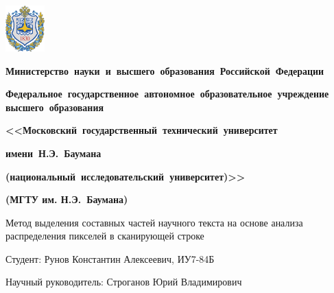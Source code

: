 \documentclass[gray]{beamer}
\begin{document}
\begingroup
{}
\begin{frame}
    \begin{minipage}{0.1\textwidth}
            \vspace{-0.1cm}
        \includegraphics[width=1.5cm]{img/bmstu.pdf}
    \end{minipage}
    \hfill
    \begin{minipage}{0.8\textwidth}\centering\bfseries
        {
            \linespread{1}\selectfont\tiny
            \vspace{0.1cm}
            \textbf{Министерство~науки~и~высшего~образования~Российской~Федерации}

            \textbf{Федеральное~государственное~автономное~образовательное~учреждение высшего~образования}

            \textbf{<<Московский~государственный~технический~университет}

            \textbf{имени~Н.Э.~Баумана}

            \textbf{(национальный~исследовательский~университет)>>}

            \vspace{-0.2cm}
            \textbf{(МГТУ им. Н.Э.~Баумана)}
            \vspace{0.1cm}
        }
    \end{minipage}

    \vfill

    \begin{center}
    \Large Метод выделения составных частей научного текста на основе анализа распределения пикселей в сканирующей строке
    \end{center}

    \vfill

    Студент: Рунов Константин Алексеевич, ИУ7-84Б

    Научный руководитель: Строганов Юрий Владимирович
\end{frame}
\endgroup
\end{document}

